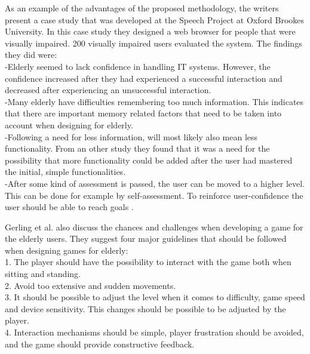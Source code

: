 As an example of the advantages of the proposed methodology, the writers present a case study that was developed at the Speech Project at Oxford Brookes University. In this case study they designed a web browser for people that were visually impaired. 200 visually impaired users evaluated the system.  The findings they did were: \\
-Elderly seemed to lack confidence in handling IT systems. However, the confidence increased after they had experienced a successful interaction and decreased after experiencing an unsuccessful interaction.\\
-Many elderly have difficulties remembering too much information. This indicates that there are important memory related factors that need to be taken into account when designing for elderly. \\
-Following a need for less information, will most likely also mean less functionality. From an other study they found that it was a need for the possibility that more functionality could be added after the user had mastered the initial, simple functionalities. \\
-After some kind of assessment is passed, the user can be moved to a higher level. This can be done for example by self-assessment. To reinforce user-confidence the user should be able to reach goals \cite{gregor}. 

Gerling et al. \cite{gerling1} also discuss the chances and challenges when developing a game for the elderly users. They suggest four major guidelines that should be followed when designing games for elderly: \\
1. The player should have the possibility to interact with the game both when sitting and standing. \\
2. Avoid too extensive and sudden movements.\\
3. It should be possible to adjust the level when it comes to difficulty, game speed and device sensitivity. This changes should be possible to be adjusted by the player. \\
4. Interaction mechanisms should be simple, player frustration should be avoided, and the game should provide constructive feedback.

